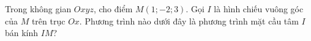 \begin{ex}
Trong không gian $Oxyz$, cho điểm $M(1;-2;3)$. Gọi $I$ là hình chiếu vuông góc của $M$ trên trục $Ox$. Phương trình nào dưới đây là phương trình mặt cầu tâm $I$ bán kính $IM$?
\end{ex}
